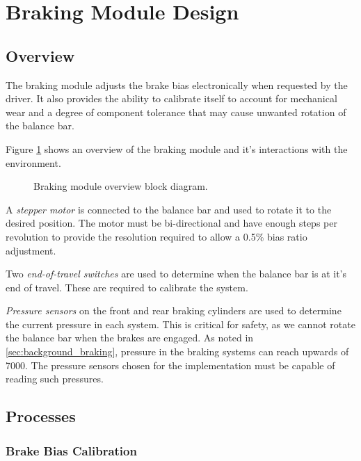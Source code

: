 \section{Braking Module Design\label{sec:Braking-Module-Design}}

\subsection{Overview}

The braking module adjusts the brake bias electronically when requested by the driver. It also provides the ability to calibrate itself to account for mechanical wear and a degree of component tolerance that may cause unwanted rotation of the balance bar. 

Figure \ref{fig:design_brake_overview_block} shows an overview of the braking module and it's interactions with the environment. 

\begin{figure}[H]
\centering

\caption{Braking module overview block diagram.}
\label{fig:design_brake_overview_block}
\end{figure}

A \emph{stepper motor} is connected to the balance bar and used to rotate it to the desired position. The motor must be bi-directional and have enough steps per revolution to provide the resolution required to allow a 0.5\% bias ratio adjustment.

Two \emph{end-of-travel switches} are used to determine when the balance bar is at it's end of travel. These are required to calibrate the system. 

\emph{Pressure sensors} on the front and rear braking cylinders are used to determine the current pressure in each system. This is critical for safety, as we cannot rotate the balance bar when the brakes are engaged. As noted in \ref{sec:background_braking}, pressure in the braking systems can reach upwards of \unit{7000}{\kilo\pascal}. The pressure sensors chosen for the implementation must be capable of reading such pressures.

\subsection{Processes}

\subsubsection{Brake Bias Calibration}

